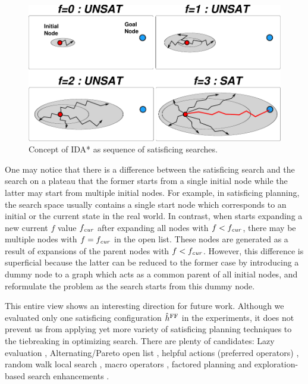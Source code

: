 \begin{figure}[htbp]
 \includegraphics{img/astar/plateau-6.pdf}
 \caption{Concept of IDA* as sequence of satisficing searches.}
\end{figure}

One may notice that there is a difference between the satisficing search and the search on a plateau that
the former starts from a single initial node while the latter may start from multiple initial nodes.
For example, in satisficing planning, the search space usually contains a single start node which corresponds to an initial or the current state in the real world.
% 
In contrast, when \astar starts expanding a new current $f$ value $f_{\mit{cur}}$ after expanding all nodes with $f<f_\mit{cur}$,
there may be multiple nodes with $f=f_\mit{cur}$ in the open list.
These nodes are generated as a result of expansions of the parent nodes with $f<f_\mit{cur}$.
% 
However, this difference is superficial because the latter can be reduced to the former case by introducing a dummy
node to a graph which acts as a common parent of all initial nodes, and reformulate the problem as the search
starts from this dummy node.

This entire view shows an interesting direction for future work.
Although we evaluated only one \sota satisficing configuration $\ffo$ in
the experiments, it does not prevent us from applying yet
more variety of satisficing planning techniques to the tiebreaking in optimizing search.
There are plenty of candidates: Lazy evaluation \cite{richter2010lama}, Alternating/Pareto open
list \cite{RogerH10}, helpful actions (preferred operators) \cite{Hoffmann01},
random walk local search \cite{nakhost2009monte}, macro operators
\cite{Botea2005,ChrpaVM15}, factored planning
\cite{amir2003factored,brafman2006factored,Asai2015} and
exploration-based search enhancements
\cite{valenzano2014comparison,xie14type,Valenzano2016}.


